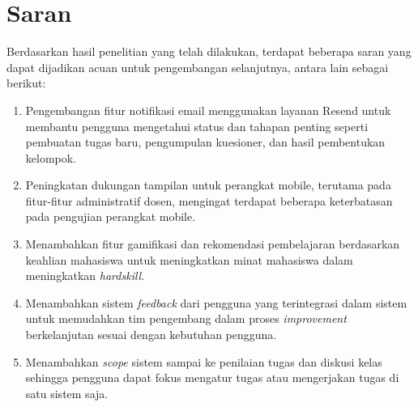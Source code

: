 \section{Saran} \label{V.Saran}
Berdasarkan hasil penelitian yang telah dilakukan, terdapat beberapa saran yang dapat dijadikan acuan untuk pengembangan selanjutnya, antara lain sebagai berikut:
\begin{enumerate}
	\item Pengembangan fitur notifikasi email menggunakan layanan Resend untuk membantu pengguna mengetahui status dan tahapan penting seperti pembuatan tugas baru, pengumpulan kuesioner, dan hasil pembentukan kelompok.
	\item Peningkatan dukungan tampilan untuk perangkat mobile, terutama pada fitur-fitur administratif dosen, mengingat terdapat beberapa keterbatasan pada pengujian perangkat mobile.
	\item Menambahkan fitur gamifikasi dan rekomendasi pembelajaran berdasarkan keahlian mahasiswa untuk meningkatkan minat mahasiswa dalam meningkatkan \textit{hardskill}.
	\item Menambahkan sistem \textit{feedback} dari pengguna yang terintegrasi dalam sistem untuk memudahkan tim pengembang dalam proses \textit{improvement} berkelanjutan sesuai dengan kebutuhan pengguna.
	\item Menambahkan \textit{scope} sistem sampai ke penilaian tugas dan diskusi kelas sehingga pengguna dapat fokus mengatur tugas atau mengerjakan tugas di satu sistem saja.
\end{enumerate}
